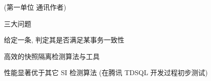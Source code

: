 
\begin{frame}{}
\end{frame}

\begin{frame}{}
	\begin{center}
		(第一单位 \quad 通讯作者)
		\vspace{0.60cm}

		\vspace{0.50cm}
	\end{center}
\end{frame}

\begin{frame}{}
	\begin{center}
		{三大问题}


		{给定一条, 判定其是否满足某事务一致性}
	\end{center}
\end{frame}

\begin{frame}{}
  \begin{center}
     高效的快照隔离检测算法与工具~

  \end{center}
\end{frame}

\begin{frame}{}
  \begin{center}
  \end{center}

	\vspace{0.30cm}
	\begin{center}
		{性能显著优于其它 SI 检测算法 {\small (在腾讯 TDSQL 开发过程初步测试)}}
	\end{center}
\end{frame}

